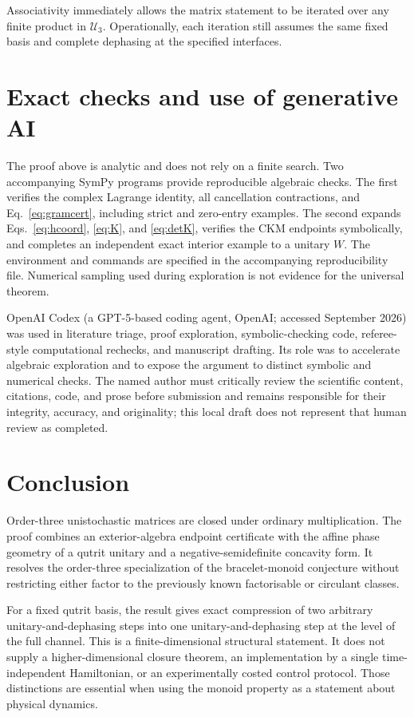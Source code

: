 \documentclass[aip,jmp,amsmath,amssymb,preprint,nofootinbib]{revtex4-2}
\newcommand{\Ud}{\mathcal{U}_3}
\begin{document}
Associativity immediately allows the matrix statement to be iterated over
any finite product in $\Ud$.  Operationally, each iteration still assumes
the same fixed basis and complete dephasing at the specified interfaces.

\section{Exact checks and use of generative AI}
\label{sec:methods}

The proof above is analytic and does not rely on a finite search.  Two
accompanying SymPy programs provide reproducible algebraic checks.
The first verifies the complex Lagrange identity, all cancellation
contractions, and Eq.~\eqref{eq:gramcert}, including strict and zero-entry
examples.  The second expands Eqs.~\eqref{eq:hcoord}, \eqref{eq:K}, and
\eqref{eq:detK}, verifies the CKM endpoints symbolically, and completes an
independent exact interior example to a unitary $W$.  The environment and
commands are specified in the accompanying reproducibility file.  Numerical
sampling used during exploration is not evidence for the universal theorem.

OpenAI Codex (a GPT-5-based coding agent, OpenAI; accessed September 2026)
was used in literature triage, proof exploration, symbolic-checking code,
referee-style computational rechecks, and manuscript drafting.  Its role was
to accelerate algebraic exploration and to expose the argument to distinct
symbolic and numerical checks.  The named author must critically review the
scientific content, citations, code, and prose before submission and remains
responsible for their integrity, accuracy, and originality; this local draft
does not represent that human review as completed.

\section{Conclusion}

Order-three unistochastic matrices are closed under ordinary multiplication.
The proof combines an exterior-algebra endpoint certificate with the affine
phase geometry of a qutrit unitary and a negative-semidefinite concavity
form.  It resolves the order-three specialization of the bracelet-monoid
conjecture without restricting either factor to the previously known
factorisable or circulant classes.

For a fixed qutrit basis, the result gives exact compression of two arbitrary
unitary-and-dephasing steps into one unitary-and-dephasing step at the level
of the full channel.  This is a finite-dimensional structural statement.  It
does not supply a higher-dimensional closure theorem, an implementation by a
single time-independent Hamiltonian, or an experimentally costed control
protocol.  Those distinctions are essential when using the monoid property
as a statement about physical dynamics.
\end{document}

